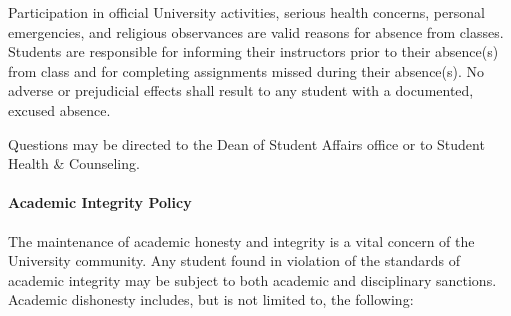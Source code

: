 \documentclass[12pt]{article}
\newcounter{ex}\setcounter{ex}{0}
\begin{document}
Participation in official University activities, serious health concerns, 
personal emergencies, and religious observances are valid reasons for absence 
from classes. Students are responsible for informing their instructors prior 
to their absence(s) from class and for completing assignments missed during 
their absence(s). No adverse or prejudicial effects shall result to any student 
with a documented, excused absence.  

Questions may be directed to the Dean of Student Affairs office or to Student 
Health \& Counseling.


\paragraph{Academic Integrity Policy}

The maintenance of academic honesty and integrity is a vital concern 
of the University community. Any student found in violation of the 
standards of academic integrity may be subject to both academic and 
disciplinary sanctions. Academic dishonesty includes, but is not 
limited to, the following:
\end{document}
